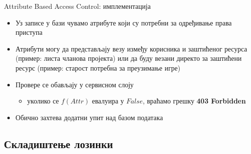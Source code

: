 \documentclass{beamer}
\begin{document}
    \begin{frame}{Attribute Based Access Control: имплементација}
        \begin{itemize}
            \item Уз записе у бази чувамо атрибуте који су потребни за одређивање права приступа
            \item Атрибути могу да представљају везу између корисника и заштићеног ресурса (пример: листа чланова пројекта) или да буду везани директо за заштићени ресурс (пример: старост потребна за преузимање игре)
            \item Провере се обављају у сервисном слоју
            \begin{itemize}
                \item уколико се \begin{math}f(Attr)\end{math} евалуира у \begin{math}False\end{math}, враћамо грешку \textbf{403 Forbidden}
            \end{itemize}
            \item Обично захтева додатни упит над базом података
        \end{itemize}
    \end{frame}
    
    \subsection{Складиштење лозинки}
    
\end{document}
